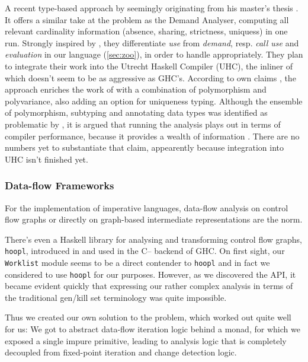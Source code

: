A recent type-based approach by \textcite{verstoep} seemingly originating from his master's thesis \parencite{verstoepthesis}. 
It offers a similar take at the problem as the Demand Analyser, computing all relevant cardinality information (absence, sharing, strictness, uniquess) in one run.
Strongly inspired by \textcite{warnsbrough}, they differentiate \emph{use} from \emph{demand}, resp. \emph{call use} and \emph{evaluation} in our language (\cf \cref{sec:zoo}), in order to handle  appropriately.
They plan to integrate their work into the Utrecht Haskell Compiler (UHC), the inliner of which doesn't seem to be as aggressive as GHC's.
According to own claims \parencite{verstoepthesis}, the approach enriches the work of \textcite{warnsbrough} with a combination of polymorphism and polyvariance, also adding an option for uniqueness typing.
Although the ensemble of polymorphism, subtyping and annotating data types was identified as problematic by \textcite{card}, it is argued that running the analysis plays out in terms of compiler performance, because it provides a wealth of information \parencite{verstoep}.
There are no numbers yet to substantiate that claim, appearently because integration into UHC isn't finished yet.

\subsubsection{Data-flow Frameworks}

For the implementation of imperative languages, data-flow analysis on control flow graphs or directly on graph-based intermediate representations \parencite{firm} \parencite{thorin} are the norm.

There's even a Haskell library for analysing and transforming control flow graphs, \texttt{hoopl}, introduced in \textcite{hoopl} and used in the C-- backend of GHC.
On first sight, our \texttt{Worklist} module seems to be a direct contender to \texttt{hoopl} and in fact we considered to use \texttt{hoopl} for our purposes.
However, as we discovered the API, it became evident quickly that expressing our rather complex analysis in terms of the traditional gen/kill set terminology was quite impossible. 

Thus we created our own solution to the problem, which worked out quite well for us:
We got to abstract data-flow iteration logic behind a  monad, for which we exposed a single impure primitive, leading to analysis logic that is completely decoupled from fixed-point iteration and change detection logic.

